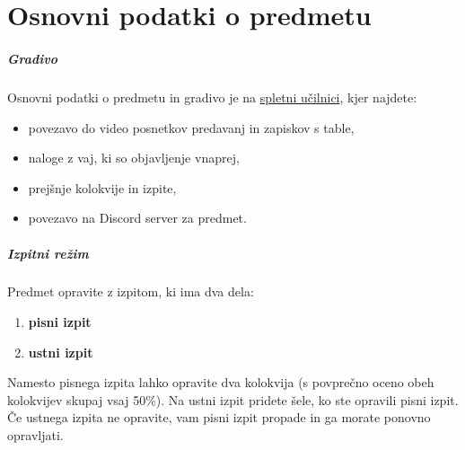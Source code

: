 \chapter{Osnovni podatki o predmetu}

\paragraph{Gradivo}
%
Osnovni podatki o predmetu in gradivo je na \href{https://ucilnica.fmf.uni-lj.si/}{spletni učilnici}, kjer najdete:
\begin{itemize}
\item povezavo do video posnetkov predavanj in zapiskov s table,
\item naloge z vaj, ki so objavljenje vnaprej,
\item prejšnje kolokvije in izpite,
\item povezavo na Discord server za predmet.
\end{itemize}

\paragraph{Izpitni režim}
%
Predmet opravite z izpitom, ki ima dva dela:
%
\begin{enumerate}
\item \textbf{pisni izpit}
\item \textbf{ustni izpit}
\end{enumerate}
%
Namesto pisnega izpita lahko opravite dva kolokvija (s povprečno oceno obeh kolokvijev skupaj vsaj 50\%). Na ustni izpit pridete šele, ko ste opravili pisni izpit. Če ustnega izpita ne opravite, vam pisni izpit propade in ga
morate ponovno opravljati.
